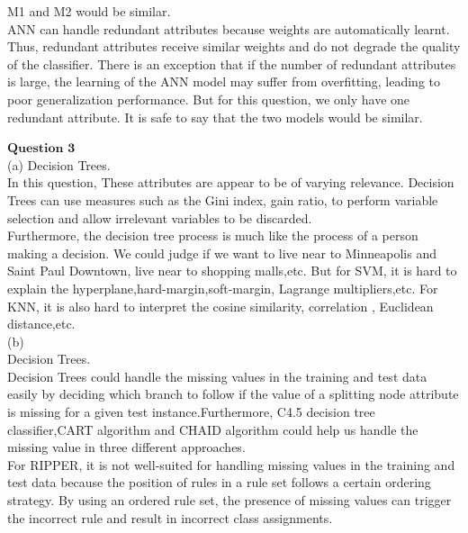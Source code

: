 \documentclass[12pt]{article}
\begin{document}
M1 and M2 would be similar.\\

ANN can handle redundant attributes because weights are automatically learnt. Thus, redundant attributes receive similar weights and do not degrade the quality of the classifier. There is an exception that if the number of redundant attributes is large, the learning of the ANN model may suffer from overfitting, leading to poor generalization performance. But for this question, we only have one redundant attribute. It is safe to say that the two models would be similar.\\

\newpage

$\textbf{Question 3}$\\

(a) Decision Trees.\\

In this question, These attributes are appear to be of
varying relevance. Decision Trees can use measures such as the Gini index, gain ratio, to perform variable selection and allow irrelevant variables to be discarded.\\

Furthermore, the decision tree process is much like the process of a person making a decision. We could judge if we want to live near to Minneapolis and Saint Paul Downtown, live near to shopping malls,etc. But for SVM, it is hard to explain the hyperplane,hard-margin,soft-margin, Lagrange multipliers,etc. For KNN, it is also hard to interpret the cosine similarity, correlation , Euclidean distance,etc.\\

(b)\\

Decision Trees. \\

Decision Trees could handle the missing values in the training and test data easily by deciding which branch to follow if the value of a splitting node attribute is missing for a given test instance.Furthermore,  C4.5 decision tree classifier,CART algorithm and CHAID algorithm could help us handle the missing value in three different approaches.\\

For RIPPER, it is not well-suited for handling missing values in the training and test data because the position of rules in a rule set follows a certain ordering strategy. By using an ordered rule set, the presence of missing values can trigger the incorrect rule and result in incorrect class assignments.\\
\end{document}
